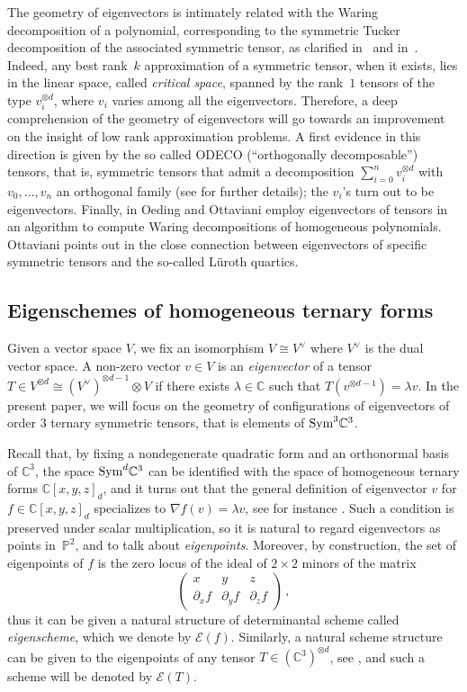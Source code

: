 \documentclass[a4paper, 11pt, reqno]{amsart}
\theoremstyle{plain}
\theoremstyle{definition}
\newcommand{\C}{\mathbb{C}}
\newcommand{\p}{\mathbb{P}}
\newcommand{\Eig}[1]{\mathcal{E}\!\left( {#1} \right)}
\begin{document}
The geometry of eigenvectors is intimately related with the Waring decomposition of a polynomial,
corresponding to the symmetric Tucker decomposition of the associated symmetric tensor,
as clarified in~\cite{DOT} and in~\cite{Ott}.
Indeed, any best rank~$k$ approximation of a symmetric tensor, when it exists, lies in the linear space,
called \emph{critical space}, spanned by the rank~$1$ tensors of the type $v_i^{\otimes d}$, where $v_i$ varies among all the eigenvectors.
Therefore, a deep comprehension of the geometry of eigenvectors will
go towards an improvement on the insight of low rank approximation problems.
A first evidence in this direction is given by the so called ODECO (``orthogonally decomposable'') tensors,
that is, symmetric tensors that admit a decomposition
$\sum _{i=0}^n v_i ^{\otimes d}$ with $v_0, \dotsc, v_n$ an orthogonal family (see \cite{Rob, BDHE} for further details);
the $v_i$'s turn out to be eigenvectors.
Finally, in \cite{OO} Oeding and Ottaviani employ eigenvectors of tensors in an algorithm to compute Waring decompositions of homogeneous polynomials.
Ottaviani points out in \cite[Section~8]{Ottaviani24} the close connection between eigenvectors of specific symmetric tensors and the so-called L\"uroth quartics.

\subsection*{Eigenschemes of homogeneous ternary forms}
Given a vector space $V$, we fix an isomorphism $V \cong V^\vee$ where $V^\vee$ is the dual vector space.
A non-zero vector $v \in V$ is an {\it eigenvector} of a tensor
 $T\in V ^{\otimes d} \cong ( V^\vee)^{\otimes d-1}\otimes V$ if there exists $\lambda\in \C$ such that
 $T(v^{\otimes d-1})= \lambda v$.
In the present paper, we will focus on the geometry of configurations of eigenvectors of order $3$ ternary symmetric tensors,
that is elements of ${\rm Sym}^3 \C^3$.

Recall that, by fixing a nondegenerate quadratic form and an orthonormal basis of $\C^3$, the space ${\rm Sym}^d \C^3$ can be identified with the space of homogeneous ternary forms
$\C[x,y,z]_d$, and it turns out that the general definition of eigenvector $v$ for $f \in \C[x,y,z]_d$ specializes
to $\nabla f (v)=\lambda v$, see for instance \cite[Section 1]{ASS}.
Such a condition is preserved under scalar multiplication,
so it is natural to regard eigenvectors as points in~$\p^2$, and to talk about \emph{eigenpoints}. Moreover,
by construction, the set of eigenpoints of $f$ is the zero locus of the ideal of $2 \times 2$ minors of the matrix
%
\begin{equation}
\label{eq:def_matrix}
\begin{pmatrix}
    x & y & z \\
    \partial_x f  & \partial_y f & \partial_z f
\end{pmatrix} \,,
\end{equation}
%
thus it can be given a natural structure of determinantal scheme called \emph{eigenscheme}, which we denote by $\Eig{f}$.
Similarly, a natural scheme structure can be given to the eigenpoints of any
tensor $T \in (\C^3)^{\otimes d}$, see \cite[Section 1]{ASS}, and such a scheme will be denoted by $\Eig{T}$.
\end{document}
